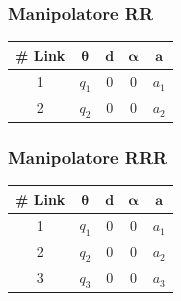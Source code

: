 ﻿\documentclass[11pt, a4paper]{article}
\begin{document}
\newpage
\begin{minipage}[t]{0.48\textwidth}
    \subsubsection*{Manipolatore RR}
    \centering
    \begin{tabular}{|c|c|c|c|c|}
        \hline
        \textbf{\# Link} & \(\boldsymbol{\theta}\) & \(\boldsymbol{d}\) & \(\boldsymbol{\alpha}\) & \(\boldsymbol{a}\) \\
        \hline
        1 & \(q_{1}\) & 0 & 0 & \(a_{1}\) \\
        \hline
        2 & \(q_{2}\) & 0 & 0 & \(a_{2}\) \\
        \hline
    \end{tabular}
\end{minipage}
\hfill
\begin{minipage}[t]{0.48\textwidth}
    \subsubsection*{Manipolatore RRR}
    \centering
    \begin{tabular}{|c|c|c|c|c|}
        \hline
        \textbf{\# Link} & \(\boldsymbol{\theta}\) & \(\boldsymbol{d}\) & \(\boldsymbol{\alpha}\) & \(\boldsymbol{a}\) \\
        \hline
        1 & \(q_{1}\) & 0 & 0 & \(a_{1}\) \\
        \hline
        2 & \(q_{2}\) & 0 & 0 & \(a_{2}\) \\
        \hline
        3 & \(q_{3}\) & 0 & 0 & \(a_{3}\) \\
        \hline
    \end{tabular}
\end{minipage}

\vspace{1cm} %
\end{document}

